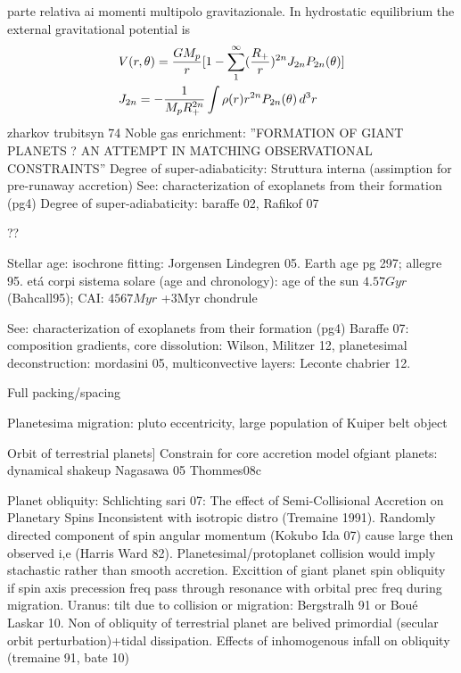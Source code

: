 \begin{workout}
parte relativa ai momenti multipolo gravitazionale. 
In hydrostatic equilibrium the external gravitational potential is
\begin{align}
&V(r,\theta)=\frac{GM_p}{r}[1-\sum_1^{\infty}(\frac{R_+}{r})^{2n}J_{2n}P_{2n}(\theta)]\\
&J_{2n}=-\frac{1}{M_pR_+^{2n}}\int\rho(r) r^{2n}P_{2n}(\theta)\,d^3r
\end{align}
zharkov trubitsyn 74
Noble gas enrichment: ''FORMATION OF GIANT PLANETS ? AN ATTEMPT IN MATCHING OBSERVATIONAL CONSTRAINTS''
Degree of super-adiabaticity: Struttura interna (assimption for pre-runaway accretion)
See: characterization of exoplanets from their formation (pg4)
Degree of super-adiabaticity: baraffe 02, Rafikof 07
\end{workout}

\begin{workout}
??
\end{workout}

\begin{workout}[Ages]
Stellar age: isochrone fitting: Jorgensen Lindegren 05.
Earth age pg 297; allegre 95.
et\'a corpi sistema solare (age and chronology): age of the sun  $4.57Gyr$ (Bahcall95); CAI: $4567Myr$ +3Myr chondrule
\end{workout}

\begin{workout}
See: characterization of exoplanets from their formation (pg4)
Baraffe 07: composition gradients, core dissolution: Wilson, Militzer 12, planetesimal deconstruction: mordasini 05, multiconvective layers: Leconte chabrier 12.
\end{workout}

\begin{workout}
Full packing/spacing

Planetesima migration: pluto eccentricity, large population of Kuiper belt object

Orbit of terrestrial planets]
Constrain for core accretion model ofgiant planets: dynamical shakeup Nagasawa 05 Thommes08c

Planet obliquity:
Schlichting sari 07: The effect of Semi-Collisional Accretion on Planetary Spins
Inconsistent with isotropic distro (Tremaine 1991). Randomly directed component of spin angular momentum (Kokubo Ida 07) cause large then observed i,e (Harris Ward 82).
Planetesimal/protoplanet collision would imply stachastic rather than smooth accretion.
Excittion of giant planet spin obliquity if spin axis precession freq pass through resonance with orbital prec freq during migration.
Uranus: tilt due to collision or migration: Bergstralh 91 or Bou\'e Laskar 10.
Non of obliquity of terrestrial planet are belived primordial (secular orbit perturbation)+tidal dissipation.
Effects of inhomogenous infall on obliquity (tremaine 91, bate 10)
\end{workout}

